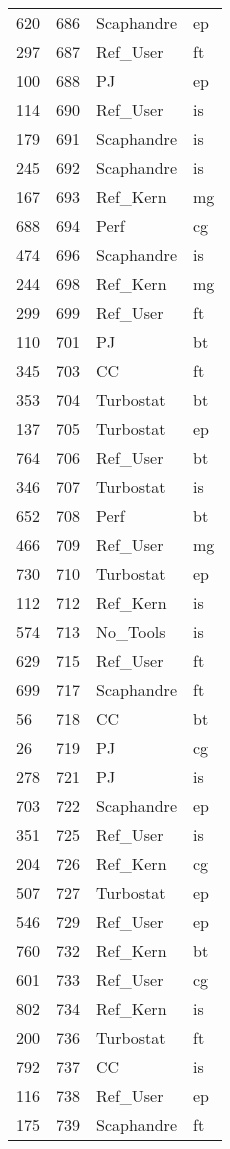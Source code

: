 \begin{tabular}{lrll}
620 & 686 & Scaphandre & ep \\
297 & 687 & Ref_User & ft \\
100 & 688 & PJ & ep \\
114 & 690 & Ref_User & is \\
179 & 691 & Scaphandre & is \\
245 & 692 & Scaphandre & is \\
167 & 693 & Ref_Kern & mg \\
688 & 694 & Perf & cg \\
474 & 696 & Scaphandre & is \\
244 & 698 & Ref_Kern & mg \\
299 & 699 & Ref_User & ft \\
110 & 701 & PJ & bt \\
345 & 703 & CC & ft \\
353 & 704 & Turbostat & bt \\
137 & 705 & Turbostat & ep \\
764 & 706 & Ref_User & bt \\
346 & 707 & Turbostat & is \\
652 & 708 & Perf & bt \\
466 & 709 & Ref_User & mg \\
730 & 710 & Turbostat & ep \\
112 & 712 & Ref_Kern & is \\
574 & 713 & No_Tools & is \\
629 & 715 & Ref_User & ft \\
699 & 717 & Scaphandre & ft \\
56 & 718 & CC & bt \\
26 & 719 & PJ & cg \\
278 & 721 & PJ & is \\
703 & 722 & Scaphandre & ep \\
351 & 725 & Ref_User & is \\
204 & 726 & Ref_Kern & cg \\
507 & 727 & Turbostat & ep \\
546 & 729 & Ref_User & ep \\
760 & 732 & Ref_Kern & bt \\
601 & 733 & Ref_User & cg \\
802 & 734 & Ref_Kern & is \\
200 & 736 & Turbostat & ft \\
792 & 737 & CC & is \\
116 & 738 & Ref_User & ep \\
175 & 739 & Scaphandre & ft \\

\end{tabular}
